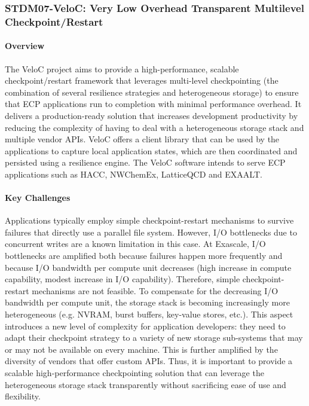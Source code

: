 \subsubsection{ STDM07-VeloC: Very Low Overhead Transparent Multilevel Checkpoint/Restart} 

\paragraph{Overview} 

The VeloC project aims to provide a high-performance, scalable
checkpoint/restart framework that leverages multi-level checkpointing
(the combination of several resilience strategies and heterogeneous
storage) to ensure that ECP applications run to completion with
minimal performance overhead. It delivers a production-ready solution
that increases development productivity by reducing the complexity of
having to deal with a heterogeneous storage stack and multiple vendor
APIs. VeloC offers a client library that can be used by the
applications to capture local application states, which are then
coordinated and persisted using a resilience engine. The VeloC
software intends to serve ECP applications such as HACC, NWChemEx,
LatticeQCD and EXAALT.

\paragraph{Key Challenges}

Applications typically employ simple checkpoint-restart mechanisms to
survive failures that directly use a parallel file system.  However,
I/O bottlenecks due to concurrent writes are a known limitation in
this case. At Exascale, I/O bottlenecks are amplified both because
failures happen more frequently and because I/O bandwidth per compute
unit decreases (high increase in compute capability, modest increase
in I/O capability). Therefore, simple checkpoint-restart mechanisms
are not feasible. To compensate for the decreasing I/O bandwidth per
compute unit, the storage stack is becoming increasingly more
heterogeneous (e.g. NVRAM, burst buffers, key-value stores,
etc.). This aspect introduces a new level of complexity for
application developers: they need to adapt their checkpoint strategy
to a variety of new storage sub-systems that may or may not be
available on every machine. This is further amplified by the diversity
of vendors that offer custom APIs. Thus, it is important to provide a
scalable high-performance checkpointing solution that can leverage the
heterogeneous storage stack transparently without sacrificing ease of
use and flexibility.


